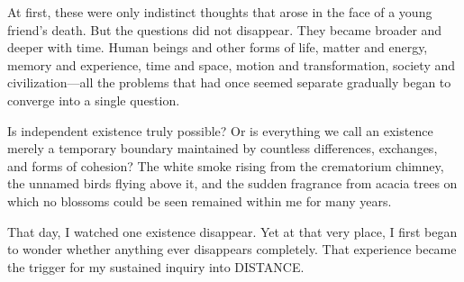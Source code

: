 At first, these were only indistinct thoughts that arose in the face of a young friend’s death. But the questions did not disappear. They became broader and deeper with time. Human beings and other forms of life, matter and energy, memory and experience, time and space, motion and transformation, society and civilization—all the problems that had once seemed separate gradually began to converge into a single question.

Is independent existence truly possible? Or is everything we call an existence merely a temporary boundary maintained by countless differences, exchanges, and forms of cohesion? The white smoke rising from the crematorium chimney, the unnamed birds flying above it, and the sudden fragrance from acacia trees on which no blossoms could be seen remained within me for many years.

That day, I watched one existence disappear. Yet at that very place, I first began to wonder whether anything ever disappears completely. That experience became the trigger for my sustained inquiry into DISTANCE.

\pagebreak